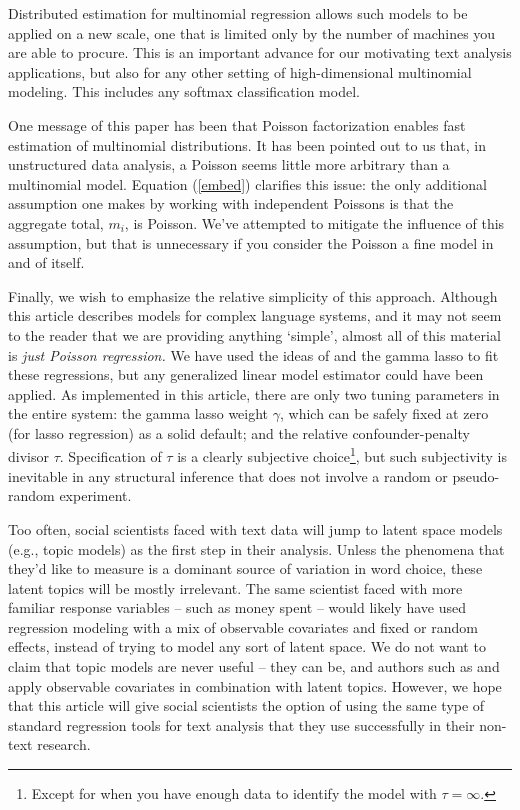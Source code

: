 \documentclass[12pt]{article}
\begin{document}
Distributed estimation for multinomial regression allows such models to be
applied on a new  scale, one that is limited only by the number of machines
you are able to procure. This is an important advance for our motivating text
analysis applications, but also for any other setting of high-dimensional
multinomial modeling.  This includes any softmax classification model.

One message of this paper has been that Poisson factorization enables fast
estimation of multinomial distributions.  It has been pointed out to us that,
in unstructured data analysis, a Poisson seems little more arbitrary than a
multinomial model.  Equation (\ref{embed}) clarifies this issue:  the only
additional assumption one makes by working with independent Poissons is that
the aggregate total, $m_i$, is Poisson.  We've attempted to mitigate the
influence of this assumption, but that is unnecessary if you consider the
Poisson a fine model in and of itself.

Finally, we wish to emphasize the relative simplicity of this approach.
Although this article describes models for complex language systems, and it
may not seem to the reader that we are providing anything `simple', almost all
of this material is {\it just Poisson regression.}   We have used the ideas of
\cite{taddy_one-step_2014} and the gamma lasso to fit these regressions, but any
generalized linear model estimator could have been applied.  As implemented in
this article, there are only two tuning parameters in the entire system:  the
gamma lasso weight $\gamma$, which can be safely fixed at zero (for lasso
regression) as a solid default; and the relative confounder-penalty divisor
$\tau$.  Specification of $\tau$ is a clearly subjective choice\footnote{Except for when you have enough data to identify the model with $\tau = \infty$.},
but such subjectivity  is inevitable in any structural inference that does not
involve a random or pseudo-random experiment.

Too often, social scientists faced with text data will jump to latent space
models (e.g., topic models) as the first step in their analysis.  Unless the
phenomena that they'd like to measure is a dominant source of variation in
word choice, these latent topics will be mostly irrelevant.  The same
scientist faced with more familiar response variables -- such as money spent
-- would likely have used regression modeling with a mix of observable
   covariates and fixed or random effects, instead of trying to model any sort
   of latent space.  We do not want to claim that topic models are never 
   useful
   -- they can be, and authors such as \citet{rabinovich_inverse_2014} and
   \cite{roberts_structural_2013} apply observable covariates in combination
   with latent topics.  However, we hope that this article will give social
   scientists the option of using the same type of standard regression tools for
   text analysis that they use successfully in their non-text research.
\end{document}
